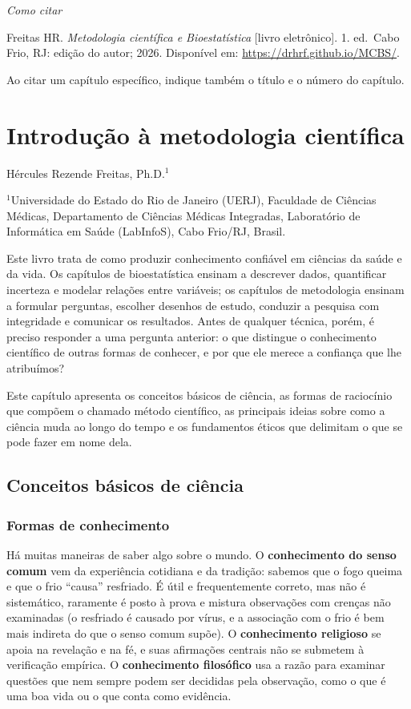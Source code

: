 \documentclass[
]{book}
\begin{document}
\emph{Como citar}

Freitas HR. \emph{Metodologia científica e Bioestatística} {[}livro eletrônico{]}. 1. ed.~Cabo Frio, RJ: edição do autor; 2026. Disponível em: \url{https://drhrf.github.io/MCBS/}.

Ao citar um capítulo específico, indique também o título e o número do capítulo.

\chapter{Introdução à metodologia científica}\label{introduuxe7uxe3o-uxe0-metodologia-cientuxedfica}

Hércules Rezende Freitas, Ph.D.\(^1\)

\(^1\)Universidade do Estado do Rio de Janeiro (UERJ), Faculdade de Ciências Médicas, Departamento de Ciências Médicas Integradas, Laboratório de Informática em Saúde (LabInfoS), Cabo Frio/RJ, Brasil.

Este livro trata de como produzir conhecimento confiável em ciências da saúde e da vida. Os capítulos de bioestatística ensinam a descrever dados, quantificar incerteza e modelar relações entre variáveis; os capítulos de metodologia ensinam a formular perguntas, escolher desenhos de estudo, conduzir a pesquisa com integridade e comunicar os resultados. Antes de qualquer técnica, porém, é preciso responder a uma pergunta anterior: o que distingue o conhecimento científico de outras formas de conhecer, e por que ele merece a confiança que lhe atribuímos?

Este capítulo apresenta os conceitos básicos de ciência, as formas de raciocínio que compõem o chamado método científico, as principais ideias sobre como a ciência muda ao longo do tempo e os fundamentos éticos que delimitam o que se pode fazer em nome dela.

\section{Conceitos básicos de ciência}\label{conceitos-buxe1sicos-de-ciuxeancia}

\subsection{Formas de conhecimento}\label{formas-de-conhecimento}

Há muitas maneiras de saber algo sobre o mundo. O \textbf{conhecimento do senso comum} vem da experiência cotidiana e da tradição: sabemos que o fogo queima e que o frio ``causa'' resfriado. É útil e frequentemente correto, mas não é sistemático, raramente é posto à prova e mistura observações com crenças não examinadas (o resfriado é causado por vírus, e a associação com o frio é bem mais indireta do que o senso comum supõe). O \textbf{conhecimento religioso} se apoia na revelação e na fé, e suas afirmações centrais não se submetem à verificação empírica. O \textbf{conhecimento filosófico} usa a razão para examinar questões que nem sempre podem ser decididas pela observação, como o que é uma boa vida ou o que conta como evidência.
\end{document}
